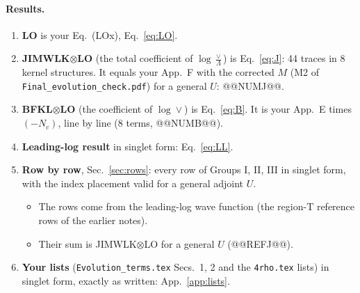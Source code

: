 \documentclass[10pt]{article}
\numberwithin{equation}{section}
\begin{document}
\paragraph{Results.}
\begin{enumerate}
\item \textbf{LO} is your Eq.~(LOx), Eq.~\eqref{eq:LO}.
\item \textbf{JIMWLK$\otimes$LO} (the total coefficient of $\log\frac{\vee}{\Lambda}$) is Eq.~\eqref{eq:J}: 44 traces in 8 kernel structures. It equals your App.~F with the corrected $M$ (M2 of \texttt{Final\_evolution\_check.pdf}) for a general $U$: @@NUMJ@@.
\item \textbf{BFKL$\otimes$LO} (the coefficient of $\log\vee$) is Eq.~\eqref{eq:B}. It is your App.~E times $(-N_c)$, line by line (8 terms, @@NUMB@@).
\item \textbf{Leading-log result} in singlet form: Eq.~\eqref{eq:LL}.
\item \textbf{Row by row}, Sec.~\ref{sec:rows}: every row of Groups I, II, III in singlet form, with the index placement valid for a general adjoint $U$.
\begin{itemize}
\item The rows come from the leading-log wave function (the region-T reference rows of the earlier notes).
\item Their sum is JIMWLK$\otimes$LO for a general $U$ (@@REFJ@@).
\end{itemize}
\item \textbf{Your lists} (\texttt{Evolution\_terms.tex} Secs.~1, 2 and the \texttt{4rho.tex} lists) in singlet form, exactly as written: App.~\ref{app:lists}.
\end{enumerate}
\end{document}
